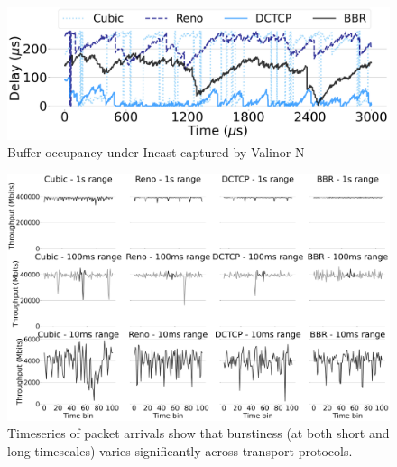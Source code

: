 \begin{figure}[t]
\centering
    \includegraphics[width=0.8\linewidth]{figs/buffer_size.pdf}
    \caption{\small{Buffer occupancy under Incast captured by Valinor-N}}
	\label{fig:transport-queue}
 \vspace{-2mm}
\end{figure}
\begin{figure}[t]
\centering   
    \vspace{3mm}
    \includegraphics[width=0.85\linewidth]{figs/incast_byte_time_series.pdf}
    \caption{\small{Timeseries of packet arrivals show that burstiness (at both short and long timescales) varies significantly across transport protocols.}}
	\label{fig:transport-ts}
     \vspace{-2mm}
\end{figure}

